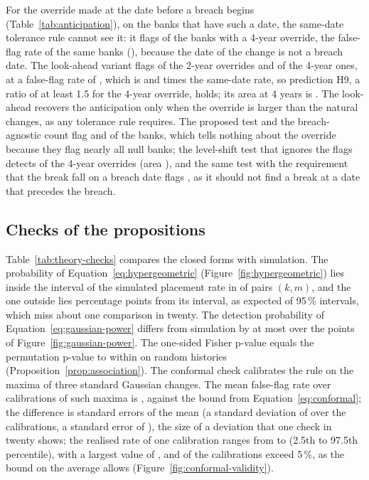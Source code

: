 For the override made at the date before a breach begins (Table~\ref{tab:anticipation}), on the \earlyN{} banks that have such a date, the same-date tolerance rule cannot see it: it flags \earlyTolFour{} of the banks with a 4-year override, the false-flag rate of the same banks (\earlyNullTol{}), because the date of the change is not a breach date. The look-ahead variant flags \earlyTolLaTwo{} of the 2-year overrides and \earlyTolLaFour{} of the 4-year ones, at a false-flag rate of \earlyNullTolLa{}, which is \earlyRatioTwo{} and \earlyRatioFour{} times the same-date rate, so prediction H9, a ratio of at least 1.5 for the 4-year override, holds; its area at 4 years is \earlyAucFourTolLa{}. The look-ahead recovers the anticipation only when the override is larger than the natural changes, as any tolerance rule requires. The proposed test and the breach-agnostic count flag \earlyNullEngine{} and \earlyAnyFour{} of the banks, which tells nothing about the override because they flag nearly all null banks; the level-shift test that ignores the flags detects \earlyShiftFour{} of the 4-year overrides (area \earlyAucFourShift{}), and the same test with the requirement that the break fall on a breach date flags \earlyShiftBFour{}, as it should not find a break at a date that precedes the breach.







\subsection{Checks of the propositions}
\label{sec:res-theory}

Table~\ref{tab:theory-checks} compares the closed forms with simulation. The probability of Equation~\eqref{eq:hypergeometric} (Figure~\ref{fig:hypergeometric}) lies inside the interval of the simulated placement rate in \hyperInside{} of \hyperCells{} pairs $(k,m)$, and the one outside lies \hyperOutGap{} percentage points from its interval, as expected of \hyperCells{} 95\,\% intervals, which miss about one comparison in twenty. The detection probability of Equation~\eqref{eq:gaussian-power} differs from simulation by at most \gaussWorst{} over the \gaussPoints{} points of Figure~\ref{fig:gaussian-power}. The one-sided Fisher p-value equals the permutation p-value to within \fisherPermMax{} on \fisherPermN{} random histories (Proposition~\ref{prop:association}). The conformal check calibrates the rule on the maxima of three standard Gaussian changes. The mean false-flag rate over \confCalibrations{} calibrations of \confNcal{} such maxima is \confMean{}, against the bound \confTheory{} from Equation~\eqref{eq:conformal}; the difference is \confZ{} standard errors of the mean (a standard deviation of \confSd{} over the calibrations, a standard error of \confSe{}), the size of a deviation that one check in twenty shows; the realised rate of one calibration ranges from \confLo{} to \confHi{} (2.5th to 97.5th percentile), with a largest value of \confMax{}, and \confShareAbove{} of the calibrations exceed 5\,\%, as the bound on the average allows (Figure~\ref{fig:conformal-validity}).

